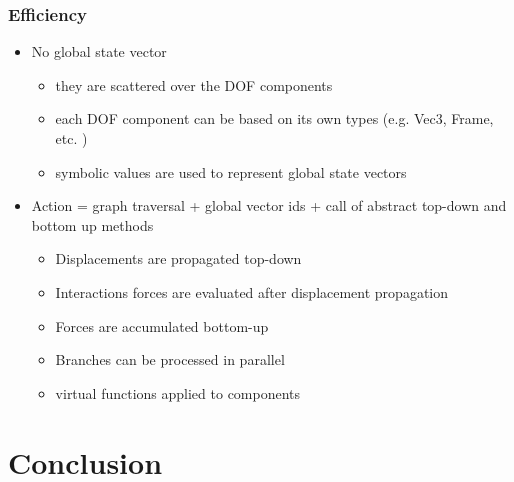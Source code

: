 \documentclass[a4paper,compress]{beamer}
\begin{document}
\begin{frame}
\frametitle{Efficiency}


\begin{itemize}
\item No global state vector
\begin{itemize}
 \item they are scattered over the DOF components
 \item each DOF component can be based on its own types (e.g. Vec3, Frame, etc. )
 \item symbolic values are used to represent global state vectors
\end{itemize}
 \item Action = graph traversal + global vector ids + call of abstract top-down and bottom up methods 
\begin{itemize}
 \item Displacements are propagated top-down
 \item Interactions forces are evaluated after displacement propagation
 \item Forces are accumulated bottom-up
 \item Branches can be processed in parallel
 \item virtual functions applied to components
\end{itemize}

\end{itemize}

\end{frame}


\section{Conclusion}
\end{document}
